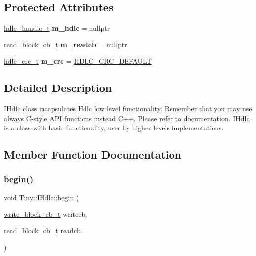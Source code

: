 \subsection*{Protected Attributes}
\begin{DoxyCompactItemize}
\item 
\mbox{\label{classTiny_1_1IHdlc_a4550680a75695031b9c5f914fdf343bb}} 
\hyperlink{struct__hdlc__handle__t}{hdlc\+\_\+handle\+\_\+t} {\bfseries m\+\_\+hdlc} = nullptr
\item 
\mbox{\label{classTiny_1_1IHdlc_a3b19d83868a66a269fcb130d54c3b522}} 
\hyperlink{tiny__types_8h_a15bec127d9ee63658563d62e92b5261b}{read\+\_\+block\+\_\+cb\+\_\+t} {\bfseries m\+\_\+readcb} = nullptr
\item 
\mbox{\label{classTiny_1_1IHdlc_a92c9a1998fccaee756d1a2872312d22f}} 
\hyperlink{group__HDLC__API_gabb73b32d08d8e79eefe9385634a74bf7}{hdlc\+\_\+crc\+\_\+t} {\bfseries m\+\_\+crc} = \hyperlink{group__HDLC__API_ggabb73b32d08d8e79eefe9385634a74bf7a5f34a095f94c39357e31badd2feb9426}{H\+D\+L\+C\+\_\+\+C\+R\+C\+\_\+\+D\+E\+F\+A\+U\+LT}
\end{DoxyCompactItemize}


\subsection{Detailed Description}
\hyperlink{classTiny_1_1IHdlc}{I\+Hdlc} class incapsulates \hyperlink{classTiny_1_1Hdlc}{Hdlc} low level functionality. Remember that you may use always C-\/style A\+PI functions instead C++. Please refer to documentation. \hyperlink{classTiny_1_1IHdlc}{I\+Hdlc} is a class with basic functionality, user by higher levels implementations. 

\subsection{Member Function Documentation}
\mbox{\label{classTiny_1_1IHdlc_aa14687d45f4762e1a87b8a4afc871a4b}} 
\subsubsection{\texorpdfstring{begin()}{begin()}}
{\footnotesize\ttfamily void Tiny\+::\+I\+Hdlc\+::begin (\begin{DoxyParamCaption}\item[{\hyperlink{tiny__types_8h_aafd634660bba76cace57a8f9b01e044d}{write\+\_\+block\+\_\+cb\+\_\+t}}]{writecb,  }\item[{\hyperlink{tiny__types_8h_a15bec127d9ee63658563d62e92b5261b}{read\+\_\+block\+\_\+cb\+\_\+t}}]{readcb }\end{DoxyParamCaption})}

